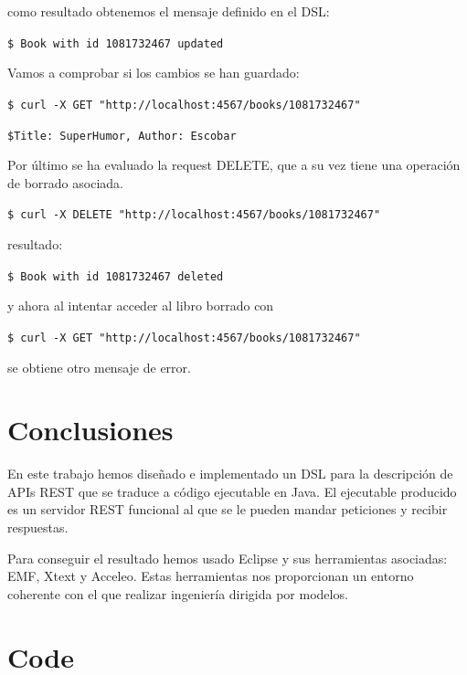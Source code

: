 \documentclass[runningheads]{llncs}
\begin{document}
como resultado obtenemos el mensaje definido en el DSL:

\texttt{\$ Book with id 1081732467 updated}

Vamos a comprobar si los cambios se han guardado:

\texttt{\$ curl -X GET "http://localhost:4567/books/1081732467"}

\texttt{\$Title: SuperHumor, Author: Escobar}

Por último se ha evaluado la request DELETE, que a su vez tiene una operación de borrado asociada.

\texttt{\$ curl -X DELETE "http://localhost:4567/books/1081732467"}

resultado:

\texttt{\$ Book with id 1081732467 deleted}

y ahora al intentar acceder al libro borrado con

\texttt{\$ curl -X GET "http://localhost:4567/books/1081732467"}

se obtiene otro mensaje de error.




\section{Conclusiones}
\label{sc:concl}

En este trabajo hemos diseñado e implementado un DSL para la descripción
de APIs REST que se traduce a código ejecutable en Java. El ejecutable
producido es un servidor REST funcional al que se le pueden mandar
peticiones y recibir respuestas.

Para conseguir el resultado hemos usado Eclipse y sus herramientas
asociadas: EMF, Xtext y Acceleo. Estas herramientas nos proporcionan un
entorno coherente con el que realizar ingeniería dirigida por modelos.

\newpage

\appendix
\section{Code}
\label{app:codigo-inicial}
\end{document}
